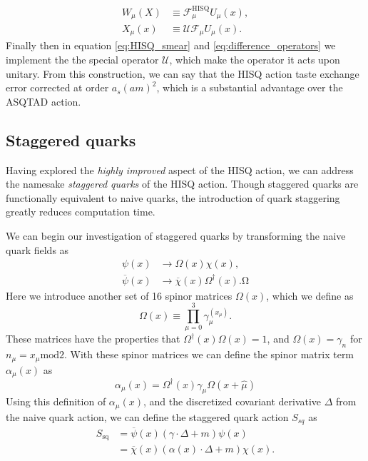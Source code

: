 \begin{equation}\label{eq:difference_operators}
\begin{split}
    W_\mu(X) &\equiv \mathcal{F}_\mu^\mathrm{HISQ} U_\mu(x), \\
    X_\mu(x) &\equiv \mathcal{U}\mathcal{F}_\mu U_\mu (x).
\end{split}
\end{equation}
Finally then in equation \ref{eq:HISQ_smear} and \ref{eq:difference_operators} we implement the the special operator $\mathcal{U}$, which make the operator it acts upon unitary.  From this construction, we can say that the HISQ action taste exchange error corrected at order $a_s(am)^2$, which is a substantial advantage over the ASQTAD action. 

\subsection{Staggered quarks}\label{sec:staggered_quarks}
Having explored the \textit{highly improved} aspect of the HISQ action, we can address the namesake \textit{staggered quarks} \cite{PhysRevD.11.395} of the HISQ action. Though staggered quarks are functionally equivalent to naive quarks, the introduction of quark staggering greatly reduces computation time.

We can begin our investigation of staggered quarks by transforming the naive quark fields as
\begin{equation}\label{eq:stagger_transform}
\begin{split}
    \psi(x) &\rightarrow \Omega(x)\chi(x), \\
    \overline{\psi}(x) &\rightarrow \overline{\chi}(x)\Omega^\dagger (x).Ω
\end{split}
\end{equation}
Here we introduce another set of 16 spinor matrices $\Omega(x)$, which we define as 
\begin{equation}\label{eq:staggered_omega}
\Omega(x) \equiv \prod_{\mu=0}^3 \gamma_\mu^{(x_\mu)}.
\end{equation}
These matrices have the properties that $\Omega^\dagger(x)\Omega(x) = 1$, and $\Omega(x) = \gamma_n$ for $n_\mu = x_\mu \mathrm{mod}2$.  With these spinor matrices we can define the spinor matrix term $\alpha_\mu(x)$ as 
\begin{equation}\label{eq:spinor_matrix_term}
    \alpha_\mu(x) = \Omega^\dagger(x)\gamma_\mu \Omega(x+\hat{\mu})
\end{equation}
Using this definition of $\alpha_\mu(x)$, and the discretized covariant derivative $\Delta$ from the naive quark action, we can define the staggered quark action $S_{sq}$ as
\begin{equation}\label{eq:staggered_quark_action}
\begin{split}
    S_\mathrm{sq} &= \overline{\psi}(x)(\gamma \cdot \Delta+m)\psi(x)\\ 
      &= \overline{\chi}(x)(\alpha(x)\cdot\Delta+m)\chi(x).
\end{split}
\end{equation}

